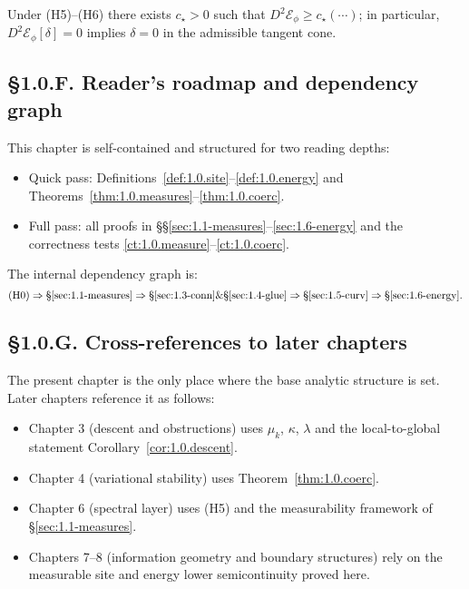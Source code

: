 \begin{theorem}[CT–Coercivity]\label{ct:1.0.coerc}
Under \textup{(H5)}–\textup{(H6)} there exists $c_\star>0$ such that $D^2\mathcal E_\phi\ge c_\star(\cdots)$; in particular, $D^2\mathcal E_\phi[\delta]=0$ implies $\delta=0$ in the admissible tangent cone.
\end{theorem}

\subsection*{§1.0.F. Reader’s roadmap and dependency graph}
This chapter is self-contained and structured for two reading depths:
\begin{itemize}
  \item Quick pass: Definitions~\ref{def:1.0.site}–\ref{def:1.0.energy} and Theorems~\ref{thm:1.0.measures}–\ref{thm:1.0.coerc}.
  \item Full pass: all proofs in §§\ref{sec:1.1-measures}–\ref{sec:1.6-energy} and the correctness tests \eqref{ct:1.0.measure}–\eqref{ct:1.0.coerc}.
\end{itemize}
The internal dependency graph is:
\[
\text{(H0)} \Rightarrow \text{§\ref{sec:1.1-measures}} \Rightarrow 
\text{§\ref{sec:1.3-conn}} \& \text{§\ref{sec:1.4-glue}}
\Rightarrow \text{§\ref{sec:1.5-curv}} \Rightarrow \text{§\ref{sec:1.6-energy}}.
\]

\subsection*{§1.0.G. Cross-references to later chapters}
The present chapter is the only place where the base analytic structure is set. 
Later chapters reference it as follows:
\begin{itemize}
  \item Chapter 3 (descent and obstructions) uses $\mu_k$, $\kappa$, $\lambda$ and the local-to-global statement Corollary~\ref{cor:1.0.descent}.
  \item Chapter 4 (variational stability) uses Theorem~\ref{thm:1.0.coerc}.
  \item Chapter 6 (spectral layer) uses \textup{(H5)} and the measurability framework of §\ref{sec:1.1-measures}.
  \item Chapters 7–8 (information geometry and boundary structures) rely on the measurable site and energy lower semicontinuity proved here.
\end{itemize}


